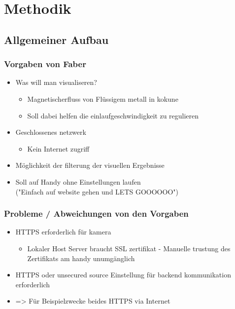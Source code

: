 \section{Methodik}


\subsection{Allgemeiner Aufbau}


\subsubsection{Vorgaben von Faber}

\begin{itemize}
	\item Was will man visualiseren?
	\begin{itemize}
		\item Magnetischerfluss von Flüssigem metall in kokune
		\item Soll dabei helfen die einlaufgeschwindigkeit zu regulieren
	\end{itemize}
	
	\item Geschlossenes netzwerk
	\begin{itemize}
		\item Kein Internet zugriff
	\end{itemize}
	
	\item Möglichkeit der filterung der visuellen Ergebnisse
	\item Soll auf Handy ohne Einstellungen laufen\\
		("Einfach auf website gehen und LETS GOOOOOO")
\end{itemize}


\subsubsection{Probleme / Abweichungen von den Vorgaben}

\begin{itemize}
	\item HTTPS erforderlich für kamera
	\begin{itemize}
		\item Lokaler Host Server braucht SSL zertifikat - Manuelle trustung des Zertifikats am handy unumgänglich
	\end{itemize}
	
	\item HTTPS oder unsecured source Einstellung für backend kommunikation erforderlich
	\item=> Für Beispielzwecke beides HTTPS via Internet
\end{itemize}


